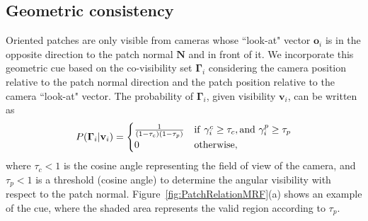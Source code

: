 \documentclass[10pt,twocolumn,letterpaper]{article}
\begin{document}
\subsection{Geometric consistency} \label{sub:Normal-cue}

Oriented patches are only visible from cameras whose ``look-at" vector $\mathbf{o}_i$ is in the opposite direction to the patch normal $\mathbf{N}$ and in front of it. We incorporate this geometric cue based on the co-visibility set $\mathbf{\Gamma}_i$ considering the camera position relative to the patch normal direction and the patch position relative to the camera ``look-at" vector. The probability of $\mathbf{\Gamma}_i$, given visibility $\mathbf{v}_i$, can be written as 
\begin{eqnarray}
P(\mathbf{\Gamma}_i | \mathbf{v}_i ) = \begin{cases} \frac{1}{ (1- \tau_c)(1- \tau_p)} & {\rm if~} \gamma_i^c \geq \tau_c,{\rm and~} \gamma_i^p \geq  \tau_p  \\
                                                           0 & {\rm otherwise,}\end{cases} 
\label{eq:eq_normal}
\end{eqnarray}
where $\tau_c<1 $ is the cosine angle representing the field of view of the camera, and $\tau_p<1$ is a threshold (cosine angle) to determine the angular visibility with respect to the patch normal. Figure~\ref{fig:PatchRelationMRF}(a) shows an example of the cue, where the shaded area represents the valid region according to $\tau_p$.

\end{document}
